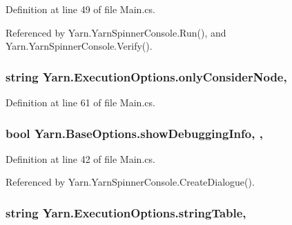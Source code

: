 Definition at line 49 of file Main.\-cs.



Referenced by Yarn.\-Yarn\-Spinner\-Console.\-Run(), and Yarn.\-Yarn\-Spinner\-Console.\-Verify().

\hypertarget{a00099_af4c0062a1d46281d377f87084fde374e}{
\subsubsection[{only\-Consider\-Node}]{\setlength{\rightskip}{0pt plus 5cm}string Yarn.\-Execution\-Options.\-only\-Consider\-Node\hspace{0.3cm}{\ttfamily [get]}, {\ttfamily [set]}}}\label{a00099_af4c0062a1d46281d377f87084fde374e}


Definition at line 61 of file Main.\-cs.

\hypertarget{a00040_a89964ea17bd19caf00cb5bff563ed01c}{
\subsubsection[{show\-Debugging\-Info}]{\setlength{\rightskip}{0pt plus 5cm}bool Yarn.\-Base\-Options.\-show\-Debugging\-Info\hspace{0.3cm}{\ttfamily [get]}, {\ttfamily [set]}, {\ttfamily [inherited]}}}\label{a00040_a89964ea17bd19caf00cb5bff563ed01c}


Definition at line 42 of file Main.\-cs.



Referenced by Yarn.\-Yarn\-Spinner\-Console.\-Create\-Dialogue().

\hypertarget{a00099_a7e43c3b73722956cb0f5d507e4eef527}{
\subsubsection[{string\-Table}]{\setlength{\rightskip}{0pt plus 5cm}string Yarn.\-Execution\-Options.\-string\-Table\hspace{0.3cm}{\ttfamily [get]}, {\ttfamily [set]}}}\label{a00099_a7e43c3b73722956cb0f5d507e4eef527}


